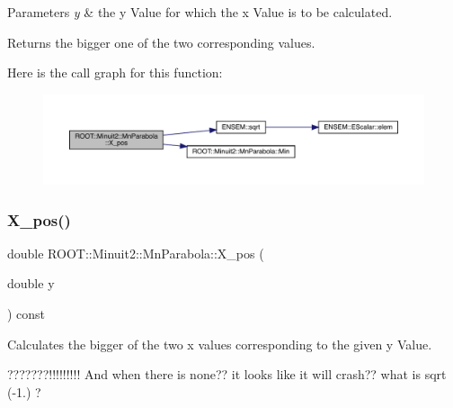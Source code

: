 \begin{DoxyParams}{Parameters}
{\em y} & the y Value for which the x Value is to be calculated.\\
\hline
\end{DoxyParams}
\begin{DoxyReturn}{Returns}
the bigger one of the two corresponding values. 
\end{DoxyReturn}
Here is the call graph for this function\+:
\nopagebreak
\begin{figure}[H]
\begin{center}
\leavevmode
\includegraphics[width=350pt]{db/d7d/classROOT_1_1Minuit2_1_1MnParabola_a2b4623df00488ca3d4175eb92123066e_cgraph}
\end{center}
\end{figure}
\mbox{\label{classROOT_1_1Minuit2_1_1MnParabola_a2b4623df00488ca3d4175eb92123066e}} 
\subsubsection{\texorpdfstring{X\_pos()}{X\_pos()}\hspace{0.1cm}{\footnotesize\ttfamily [3/3]}}
{\footnotesize\ttfamily double R\+O\+O\+T\+::\+Minuit2\+::\+Mn\+Parabola\+::\+X\+\_\+pos (\begin{DoxyParamCaption}\item[{double}]{y }\end{DoxyParamCaption}) const\hspace{0.3cm}{\ttfamily [inline]}}

Calculates the bigger of the two x values corresponding to the given y Value.

???????!!!!!!!!! And when there is none?? it looks like it will crash?? what is sqrt (-\/1.) ?


